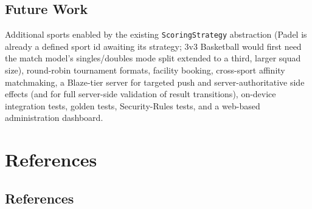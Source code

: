 \documentclass{configurations/polimi3i_thesis}
\renewcommand{\_}{\textunderscore\allowbreak}
\begin{document}
\section{Future Work}
Additional sports enabled by the existing \texttt{ScoringStrategy} abstraction (Padel is already a defined sport id awaiting its strategy; 3v3 Basketball would first need the match model's singles/doubles mode split extended to a third, larger squad size), round-robin tournament formats, facility booking, cross-sport affinity matchmaking, a Blaze-tier server for targeted push and server-authoritative side effects (and for full server-side validation of result transitions), on-device integration tests, golden tests, Security-Rules tests, and a web-based administration dashboard.


\chapter{References}
\label{ch:references}

\section{References}
\label{sec:references}
\end{document}
